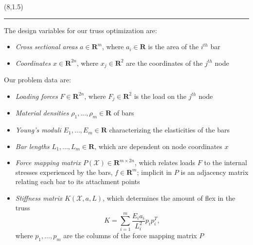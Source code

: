\documentclass[a0]{a0poster}
\def\Head#1{\noindent{\LARGE\color{bluegray} #1}\bigskip}
\begin{document}
\begin{textblock}{7.0}(8,1.5)

\hrule\medskip
\Head{Problem Formulation}

The design variables for our truss optimization are:
\begin{itemize}
  
  \item \emph{Cross sectional areas} \(a \in \mathbf{R}^{m} \), where \(a_{i}\in \mathbf{R}\) is the area of the \(i^{th}\) bar

  \item \emph{Coordinates \(x \in \mathbf{R}^{2n} \)}, where \(x_{j}\in\mathbf{R}^{2}\) are the coordinates of the \(j^{th}\) node

\end{itemize}

Our problem data are:
\begin{itemize}
  
  \item \emph{Loading forces} \(F\in\mathbf{R}^{2n}\), where \(F_{j}\in\mathbf{R}^{2}\) is the load on the \(j^{th}\) node

  \item \emph{Material densities \(\rho_{1},\ldots,\rho_{m} \in \mathbf{R} \)} of bars

  \item \emph{Young's moduli \(E_{1},\ldots,E_{m} \in \mathbf{R} \)} characterizing the elasticities of the bars

  \item \emph{Bar lengths \(L_{1},\ldots,L_{m} \in \mathbf{R} \)}, which are dependent on node coordinates \(x\)

\end{itemize}

\begin{itemize}
  
  \item \emph{Force mapping matrix \(P(\mathcal{X})\in\mathbf{R}^{m\times2n}\)}, which relates loads \(F\) to the internal stresses experienced by the bars, \(f\in\mathbf{R}^m \); implicit in \(P\) is an adjacency matrix relating each bar to its attachment points

  \item \emph{Stiffness matrix \(K(\mathcal{X}, a, L)\)}, which determines the amount of flex in the truss
  \[K = \sum\limits_{i=1}^{m}\frac{E_{i}a_{i}}{L_{i}^{2}}p_{i}p_{i}^{T},\]
  where \( p_{1},\ldots,p_{m} \) are the columns of the force mapping matrix \(P\)


\end{itemize}
\end{textblock}
\end{document}
